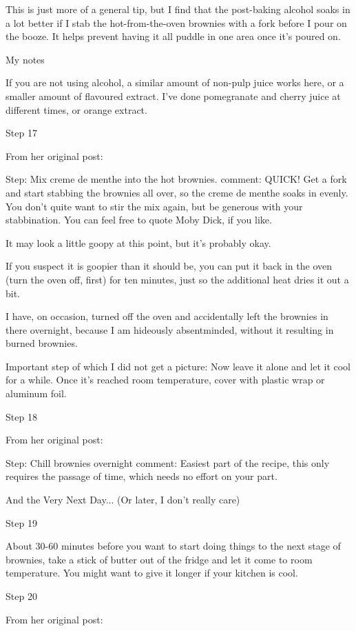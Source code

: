 This is just more of a general tip, but I find that the post-baking alcohol soaks in a lot better if I stab the hot-from-the-oven brownies with a fork before I pour on the booze. It helps prevent having it all puddle in one area once it's poured on.

My notes

If you are not using alcohol, a similar amount of non-pulp juice works here, or a smaller amount of flavoured extract. I've done pomegranate and cherry juice at different times, or orange extract.

Step 17

From her original post:

Step: Mix creme de menthe into the hot brownies.
comment: QUICK! Get a fork and start stabbing the brownies all over, so the creme de menthe soaks in evenly. You don't quite want to stir the mix again, but be generous with your stabbination. You can feel free to quote Moby Dick, if you like.

It may look a little goopy at this point, but it's probably okay.

If you suspect it is goopier than it should be, you can put it back in the oven (turn the oven off, first) for ten minutes, just so the additional heat dries it out a bit.

I have, on occasion, turned off the oven and accidentally left the brownies in there overnight, because I am hideously absentminded, without it resulting in burned brownies.

Important step of which I did not get a picture: Now leave it alone and let it cool for a while. Once it's reached room temperature, cover with plastic wrap or aluminum foil.

Step 18

From her original post:

Step: Chill brownies overnight
comment: Easiest part of the recipe, this only requires the passage of time, which needs no effort on your part.

And the Very Next Day... (Or later, I don't really care)

Step 19

About 30-60 minutes before you want to start doing things to the next stage of brownies, take a stick of butter out of the fridge and let it come to room temperature. You might want to give it longer if your kitchen is cool.

Step 20

From her original post:

